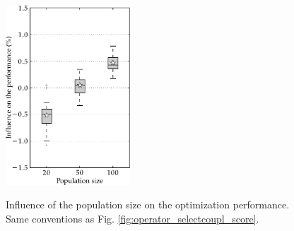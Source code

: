 \documentclass{ametsoc}
\begin{document}
\begin{figure}[t]
	\begin{center}
		\noindent\includegraphics[width=11pc,angle=0]{fig13.pdf}\\
	\end{center}
	\caption{Influence of the population size on the optimization performance. Same conventions as Fig. \ref{fig:operator_selectcoupl_score}.}
	\label{fig:option_taillepop_score}
\end{figure}
\end{document}
